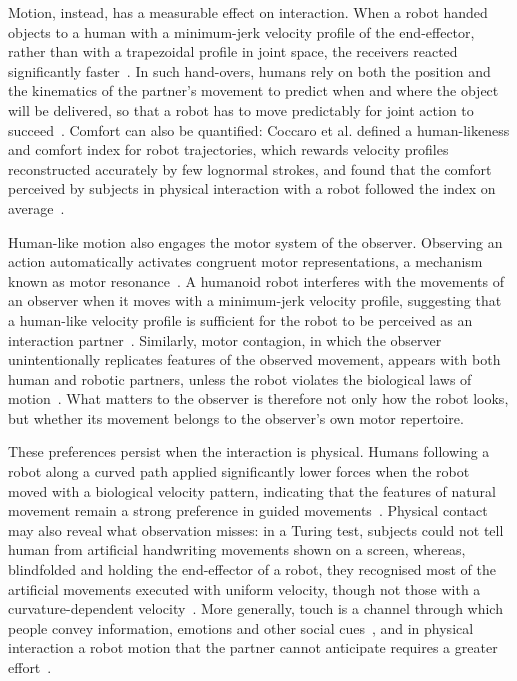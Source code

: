 \documentclass[12pt]{report}
\begin{document}
Motion, instead, has a measurable effect on interaction. When a robot handed objects to a human with a minimum-jerk velocity profile of the end-effector, rather than with a trapezoidal profile in joint space, the receivers reacted significantly faster~\cite{huber2008}. In such hand-overs, humans rely on both the position and the kinematics of the partner's movement to predict when and where the object will be delivered, so that a robot has to move predictably for joint action to succeed~\cite{glasauer2010}. Comfort can also be quantified: Coccaro et al. defined a human-likeness and comfort index for robot trajectories, which rewards velocity profiles reconstructed accurately by few lognormal strokes, and found that the comfort perceived by subjects in physical interaction with a robot followed the index on average~\cite{coccaro}.

Human-like motion also engages the motor system of the observer. Observing an action automatically activates congruent motor representations, a mechanism known as motor resonance~\cite{bisio2014}. A humanoid robot interferes with the movements of an observer when it moves with a minimum-jerk velocity profile, suggesting that a human-like velocity profile is sufficient for the robot to be perceived as an interaction partner~\cite{kupferberg2011}. Similarly, motor contagion, in which the observer unintentionally replicates features of the observed movement, appears with both human and robotic partners, unless the robot violates the biological laws of motion~\cite{bisio2014}. What matters to the observer is therefore not only how the robot looks, but whether its movement belongs to the observer's own motor repertoire.

These preferences persist when the interaction is physical. Humans following a robot along a curved path applied significantly lower forces when the robot moved with a biological velocity pattern, indicating that the features of natural movement remain a strong preference in guided movements~\cite{maurice2018}. Physical contact may also reveal what observation misses: in a Turing test, subjects could not tell human from artificial handwriting movements shown on a screen, whereas, blindfolded and holding the end-effector of a robot, they recognised most of the artificial movements executed with uniform velocity, though not those with a curvature-dependent velocity~\cite{touchvsvision}. More generally, touch is a channel through which people convey information, emotions and other social cues~\cite{hapticcomm}, and in physical interaction a robot motion that the partner cannot anticipate requires a greater effort~\cite{maurice2018}.
\end{document}
